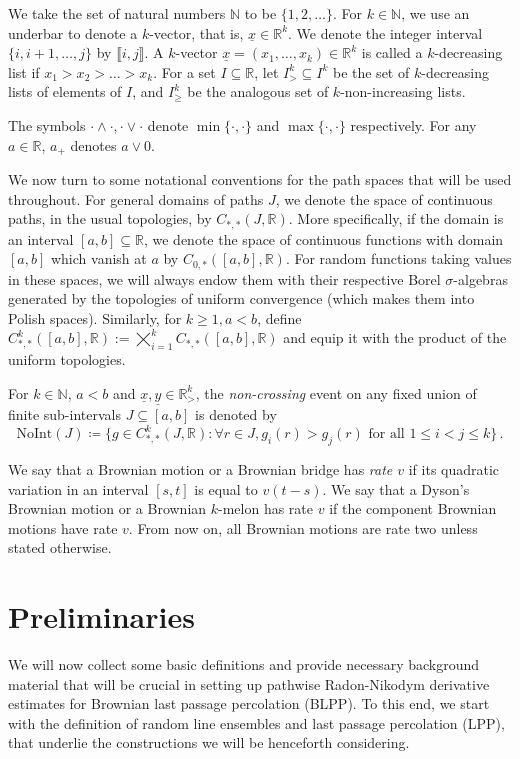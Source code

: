 \documentclass[11pt, reqno]{amsart}
\numberwithin{equation}{section}
\newcommand{\N}{\ensuremath{\mathbb{N}}}
\newcommand{\R}{\ensuremath{\mathbb{R}}}
\begin{document}
We take the set of natural numbers $\N$ to be $\{1,2, \ldots \}$. For $k\in \N$, we use an underbar to denote a $k$-vector, that is, $\underline{x}\in \R^k$. We denote the integer interval $\{i,i+1, \ldots, j\}$ by $\llbracket i, j\rrbracket$. A $k$-vector $\underline x = (x_1, \ldots, x_k)\in \R^k$ is called a $k$-decreasing list if $x_1>x_2> \ldots >x_k$. For a set $I\subseteq \R$, let $I^k_> \subseteq I^k$ be the set of $k$-decreasing lists of elements of $I$, and $I^k_{\geq}$ be the analogous set of $k$-non-increasing lists.

The symbols $\cdot \land \cdot , \cdot \lor \cdot$ denote $\min\{\cdot, \cdot \}$ and $\max\{\cdot, \cdot \}$ respectively. For any $a
\in \R$, $a_+$ denotes $a\lor 0$.

We now turn to some notational conventions for the path spaces that will be used throughout. For general domains of paths $J$, we denote the space of continuous paths, in the usual topologies, by $C_{*,*}(J, \R)$. More specifically, if the domain is an interval $[a,b]\subseteq \R$, we denote the space of continuous functions with domain $[a,b]$ which vanish at $a$ by $C_{0,*}([a,b], \R)$. For random functions taking values in these spaces, we will always endow them with their respective Borel $\sigma$-algebras generated by the topologies of uniform convergence (which makes them into Polish spaces). Similarly, for $k\ge 1, a < b$, define $C^k_{*,*}([a,b], \R):= \bigtimes_{i=1}^k C_{*,*}([a,b], \R)$ and equip it with the product of the uniform topologies. 

For $k\in \N$, $a<b$ and $\underline{x},\underline{y}\in \R^k_{>}$, the \textit{non-crossing} event on any fixed union of finite sub-intervals $J \subseteq [a,b]$ is denoted by
\begin{equation}\label{eq: noint}
\mathrm{NoInt}(J) \coloneqq \Big\{g \in C^k_{*, *}(J, \R): \forall r\in J,  g_{i}(r) > g_{j}(r) \textrm{ for all } 1\leq i<j\leq k\Big\}\,.
\end{equation} 

We say that a Brownian motion or a Brownian bridge has \textit{rate $v$} if its quadratic variation in an interval $[s,t]$ is equal to $v(t-s)$. We say that a Dyson's Brownian motion or a Brownian $k$-melon has rate $v$ if the component Brownian motions have rate $v$. From now on, all Brownian motions are rate two unless stated otherwise. 

\section{Preliminaries}\label{sec: preliminaries}
We will now collect some basic definitions and provide necessary background material that will be crucial in setting up pathwise Radon-Nikodym derivative estimates for Brownian last passage percolation (BLPP). To this end, we start with the definition of random line ensembles and last passage percolation (LPP), that underlie the constructions we will be henceforth considering.
\end{document}
